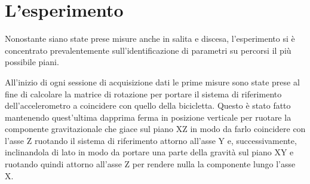 \documentclass[class=article]{standalone}
\begin{document}
	\section{L'esperimento}
	Nonostante siano state prese misure anche in salita e discesa, l'esperimento si è concentrato prevalentemente sull'identificazione di parametri su percorsi il più possibile piani.
	
	All'inizio di ogni sessione di acquisizione dati le prime misure sono state prese al fine di calcolare la matrice di rotazione per portare il sistema di riferimento dell'accelerometro a coincidere con quello della bicicletta. Questo è stato fatto mantenendo quest'ultima dapprima ferma in posizione verticale per ruotare la componente gravitazionale che giace sul piano XZ in modo da farlo coincidere con l'asse Z ruotando il sistema di riferimento attorno all'asse Y e, successivamente, inclinandola di lato in modo da portare una parte della gravità sul piano XY e ruotando quindi attorno all'asse Z per rendere nulla la componente lungo l'asse X.
\end{document}
